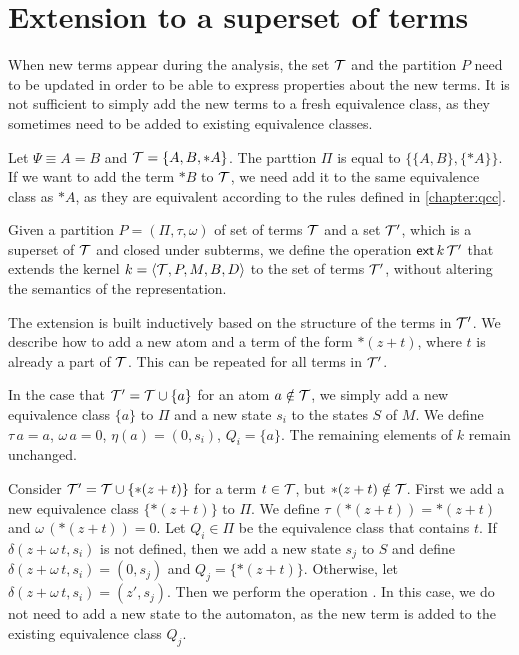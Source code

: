 \section{Extension to a superset of terms}

When new terms appear during the analysis, the set $\mathcal{T}$ and the partition $P$ need to be updated
in order to be able to express properties about the new terms.
It is not sufficient to simply add the new terms to a fresh equivalence class,
as they sometimes need to be added to existing equivalence classes.

\begin{example}
    Let $\Psi \equiv A = B$ and $\mathcal{T} = \{A, B, *A\}$.
    The parttion $\Pi$ is equal to $\{\{A, B\}, \{*A\}\}$.
    If we want to add the term $*B$ to $\mathcal{T}$, we need add it to the same equivalence class as $*A$,
    as they are equivalent according to the rules defined in \cref{chapter:qcc}.
\end{example}

Given a partition $P = (\Pi, \tau, \omega)$ of set of terms $\mathcal{T}$ and a set $\mathcal{T}'$, which is a superset of $\mathcal{T}$ and closed under subterms,
we define the operation $\textsf{ext}\,{k}\,{\mathcal{T}'}$ that extends the kernel $k = \langle\mathcal{T}, P, M, B, D\rangle$ to the set of terms $\mathcal{T}'$,
without altering the semantics of the representation.

The extension is built inductively based on the structure of the terms in $\mathcal{T}'$.
We describe how to add a new atom and a term of the form $*(z+t)$, where $t$ is already a part of $\mathcal{T}$.
This can be repeated for all terms in $\mathcal{T}'$.

In the case that $\mathcal{T}' = \mathcal{T} \cup \{a\}$ for an atom $a \notin \mathcal{T}$, we simply add a new
equivalence class $\{a\}$ to $\Pi$ and a new state $s_i$ to the states $S$ of $M$.
We define $\tau\,a = a$, $\omega\,a=0$, $\eta(a) = (0,s_i)$, $Q_i = \{a\}$.
The remaining elements of $k$ remain unchanged.

Consider $\mathcal{T}' = \mathcal{T} \cup \{*(z+t)\}$ for a term $t \in \mathcal{T}$, but $*(z + t) \notin \mathcal{T}$.
First we add a new equivalence class $\{*(z+t)\}$ to $\Pi$.
We define $\tau\,(*(z+t)) = *(z+t)$ and $\omega\,(*(z+t))=0$.
Let $Q_i \in \Pi$ be the equivalence class that contains $t$.
If $\delta(z + \omega\,t,s_i)$ is not defined, then we add a new state $s_j$ to $S$
and define $\delta(z + \omega\,t, s_i) = (0, s_j)$ and $Q_j = \{*(z+t)\}$.
Otherwise, let $\delta(z + \omega\,t, s_i) = (z', s_j)$.
Then we perform the operation .
In this case, we do not need to add a new state to the automaton,
as the new term is added to the existing equivalence class $Q_j$.
